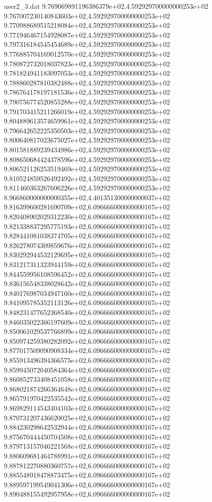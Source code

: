 \begin{filecontents}{user2_3.dat}
9.769069891196386379e+02,4.592929700000000253e+02
9.767007230140843603e+02,4.592929700000000253e+02
9.770988689515218084e+02,4.592929700000000253e+02
9.771946467154928087e+02,4.592929700000000253e+02
9.797316184545454689e+02,4.592929700000000253e+02
9.776885704169012570e+02,4.592929700000000253e+02
9.780872732018037823e+02,4.592929700000000253e+02
9.781824941183097053e+02,4.592929700000000253e+02
9.788860287810382488e+02,4.592929700000000253e+02
9.786764178197181536e+02,4.592929700000000253e+02
9.790756774520855288e+02,4.592929700000000253e+02
9.791703415211266019e+02,4.592929700000000253e+02
9.804889613574659961e+02,4.592929700000000253e+02
9.796642652225350503e+02,4.592929700000000253e+02
9.800640817023675027e+02,4.592929700000000253e+02
9.801581889239434986e+02,4.592929700000000253e+02
9.808650684424378596e+02,4.592929700000000253e+02
9.806521126253519469e+02,4.592929700000000253e+02
9.810524859526492492e+02,4.592929700000000253e+02
9.811460363267606226e+02,4.592929700000000253e+02
8.966860000000000355e+02,4.401351300000000037e+02
9.816399600281690709e+02,6.096666000000000167e+02
9.820408902029312230e+02,6.096666000000000167e+02
9.821338837295775193e+02,6.096666000000000167e+02
9.828441081038374705e+02,6.096666000000000167e+02
9.826278074309859676e+02,6.096666000000000167e+02
9.830292944532129695e+02,6.096666000000000167e+02
9.831217311323944159e+02,6.096666000000000167e+02
9.844559956108596452e+02,6.096666000000000167e+02
9.836156548338028642e+02,6.096666000000000167e+02
9.840176987034947160e+02,6.096666000000000167e+02
9.841095785352113126e+02,6.096666000000000167e+02
9.848231477652368540e+02,6.096666000000000167e+02
9.846035022366197609e+02,6.096666000000000167e+02
9.850061029537766899e+02,6.096666000000000167e+02
9.850974259380282092e+02,6.096666000000000167e+02
9.877017509090908334e+02,6.096666000000000167e+02
9.855913496394366575e+02,6.096666000000000167e+02
9.859945072040584364e+02,6.096666000000000167e+02
9.860852733408451058e+02,6.096666000000000167e+02
9.868021874266364648e+02,6.096666000000000167e+02
9.865791970422535542e+02,6.096666000000000167e+02
9.869829114543404103e+02,6.096666000000000167e+02
9.870731207436620025e+02,6.096666000000000167e+02
9.884230298642532944e+02,6.096666000000000167e+02
9.875670444450704508e+02,6.096666000000000167e+02
9.879713157046221568e+02,6.096666000000000167e+02
9.880609681464788991e+02,6.096666000000000167e+02
9.887812270880360757e+02,6.096666000000000167e+02
9.885548918478873475e+02,6.096666000000000167e+02
9.889597199549041306e+02,6.096666000000000167e+02
9.890488155492957958e+02,6.096666000000000167e+02

\end{filecontents}

